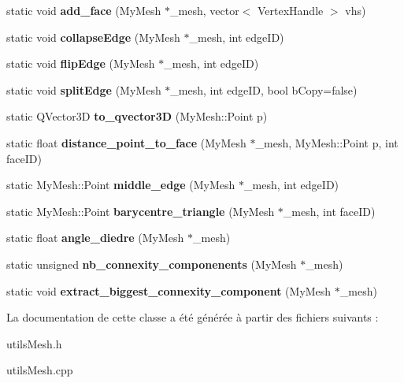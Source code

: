 \begin{DoxyCompactItemize}
static void {\bfseries add\+\_\+face} (My\+Mesh $\ast$\+\_\+mesh, vector$<$ Vertex\+Handle $>$ vhs)
\item 
\mbox{\label{classUtilsMesh_ae75a3540f04ff113cfc8676bcca9d19e}} 
static void {\bfseries collapse\+Edge} (My\+Mesh $\ast$\+\_\+mesh, int edge\+ID)
\item 
\mbox{\label{classUtilsMesh_a19119b36d76cae392c4b9a920070e00f}} 
static void {\bfseries flip\+Edge} (My\+Mesh $\ast$\+\_\+mesh, int edge\+ID)
\item 
\mbox{\label{classUtilsMesh_a524c2a3d0054783b85fa55deb7396bc7}} 
static void {\bfseries split\+Edge} (My\+Mesh $\ast$\+\_\+mesh, int edge\+ID, bool b\+Copy=false)
\item 
\mbox{\label{classUtilsMesh_a38d408dcd7a0144332d75011f1f28a1f}} 
static Q\+Vector3D {\bfseries to\+\_\+qvector3D} (My\+Mesh\+::\+Point p)
\item 
\mbox{\label{classUtilsMesh_a95ac0f209729bda6535a62697d1bef4b}} 
static float {\bfseries distance\+\_\+point\+\_\+to\+\_\+face} (My\+Mesh $\ast$\+\_\+mesh, My\+Mesh\+::\+Point p, int face\+ID)
\item 
\mbox{\label{classUtilsMesh_a25164a4817219ce93cb529aba35f5f3e}} 
static My\+Mesh\+::\+Point {\bfseries middle\+\_\+edge} (My\+Mesh $\ast$\+\_\+mesh, int edge\+ID)
\item 
\mbox{\label{classUtilsMesh_a4db1ebed704b471978fada1f1781c77a}} 
static My\+Mesh\+::\+Point {\bfseries barycentre\+\_\+triangle} (My\+Mesh $\ast$\+\_\+mesh, int face\+ID)
\item 
\mbox{\label{classUtilsMesh_ac4c332572b422495d609ea8a7ff31352}} 
static float {\bfseries angle\+\_\+diedre} (My\+Mesh $\ast$\+\_\+mesh)
\item 
\mbox{\label{classUtilsMesh_abb69a35743ba9086f9882150bde17f60}} 
static unsigned {\bfseries nb\+\_\+connexity\+\_\+componenents} (My\+Mesh $\ast$\+\_\+mesh)
\item 
\mbox{\label{classUtilsMesh_aad038179c37dbee5b313757c2e4c7c5d}} 
static void {\bfseries extract\+\_\+biggest\+\_\+connexity\+\_\+component} (My\+Mesh $\ast$\+\_\+mesh)
\end{DoxyCompactItemize}


La documentation de cette classe a été générée à partir des fichiers suivants \+:\begin{DoxyCompactItemize}
\item 
utils\+Mesh.\+h\item 
utils\+Mesh.\+cpp\end{DoxyCompactItemize}
